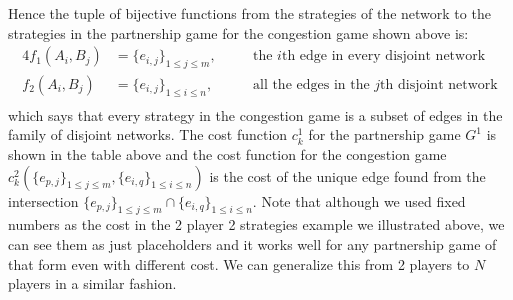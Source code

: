 \documentclass[a4paper,12pt]{article}
\theoremstyle{definition}
\begin{document}
\begin{enumerate}
\begin{enumerate}[(a)]
Hence the tuple of bijective functions from the strategies of the network to the strategies in the partnership game for the congestion game shown above is:
\begin{alignat*}{4}
f_1(A_i,B_j)&=\{e_{i,j}\}_{1\leq j\leq m}, &\quad&\text{the $i$th edge in every disjoint network }\\
f_2(A_i,B_j)&=\{e_{i,j}\}_{1\leq i\leq n}, &\quad &\text{all the edges in the $j$th disjoint network}\\
\end{alignat*}
which says that every strategy in the congestion game is a subset of edges in the family of disjoint networks. The cost function $c^1_k$ for the partnership game $G^1$ is shown in the table above and the cost function for the congestion game $c_k^2(\{e_{p,j}\}_{1\leq j \leq m},\{e_{i,q}\}_{1\leq i \leq n})$ is the cost of the unique edge found from the intersection $\{e_{p,j}\}_{1\leq j \leq m}\cap\{e_{i,q}\}_{1\leq i \leq n}$. Note that although we used fixed numbers as the cost in the 2 player 2 strategies example we illustrated above, we can see them as just placeholders and it works well for any partnership game of that form even with different cost. We can generalize this from 2 players to $N$ players in a similar fashion.

 
%
%


\end{enumerate}
\end{enumerate}
\end{document}
